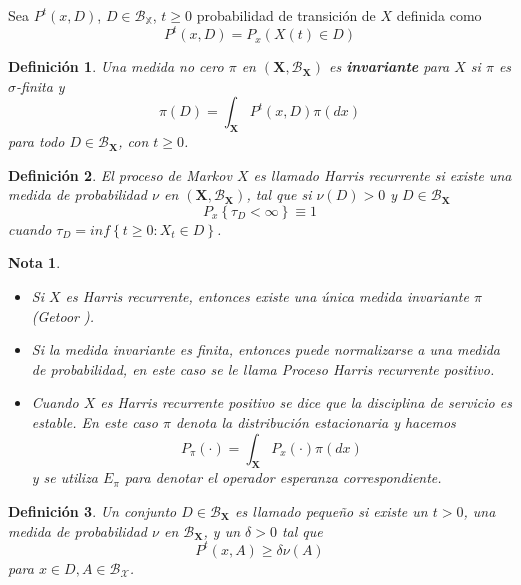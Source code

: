 \documentclass{article}
\newtheorem{Def}{Definición}[section]
\newtheorem{Note}{Nota}[section]
\numberwithin{equation}{section}
\begin{document}
Sea $P^{t}\left(x,D\right)$, $D\in\mathcal{B}_{\mathbb{X}}$, $t\geq0$ probabilidad de transici\'on de $X$ definida como \[P^{t}\left(x,D\right)=P_{x}\left(X\left(t\right)\in D\right)\]


\begin{Def}
Una medida no cero $\pi$ en $\left(\mathbf{X},\mathcal{B}_{\mathbf{X}}\right)$ es {\bf invariante} para $X$ si $\pi$ es $\sigma$-finita y \[\pi\left(D\right)=\int_{\mathbf{X}}P^{t}\left(x,D\right)\pi\left(dx\right)\] para todo $D\in \mathcal{B}_{\mathbf{X}}$, con $t\geq0$.
\end{Def}

\begin{Def}
El proceso de Markov $X$ es llamado Harris recurrente si existe una medida de probabilidad $\nu$ en $\left(\mathbf{X},\mathcal{B}_{\mathbf{X}}\right)$, tal que si $\nu\left(D\right)>0$ y $D\in\mathcal{B}_{\mathbf{X}}$ \[P_{x}\left\{\tau_{D}<\infty\right\}\equiv1\] cuando $\tau_{D}=inf\left\{t\geq0:X_{t}\in D\right\}$.
\end{Def}

\begin{Note}
\begin{itemize}
\item[i)] Si $X$ es Harris recurrente, entonces existe una \'unica medida invariante $\pi$ (Getoor \cite{Getoor}).

\item[ii)] Si la medida invariante es finita, entonces puede normalizarse a una medida de probabilidad, en este caso se le
llama Proceso {\em Harris recurrente positivo}.

\item[iii)] Cuando $X$ es Harris recurrente positivo se dice que la disciplina de servicio es estable. En este caso $\pi$ denota la distribuci\'on estacionaria y hacemos \[P_{\pi}\left(\cdot\right)=\int_{\mathbf{X}}P_{x}\left(\cdot\right)\pi\left(dx\right)\] y se utiliza $E_{\pi}$ para denotar el operador esperanza correspondiente.
\end{itemize}
\end{Note}

\begin{Def}\label{Def.Cto.Peq.}
Un conjunto $D\in\mathcal{B_{\mathbf{X}}}$ es llamado peque\~no si existe un $t>0$, una medida de probabilidad $\nu$ en $\mathcal{B_{\mathbf{X}}}$, y un $\delta>0$ tal que \[P^{t}\left(x,A\right)\geq\delta\nu\left(A\right)\] para $x\in D,A\in\mathcal{B_{X}}$.
\end{Def}
\end{document}
